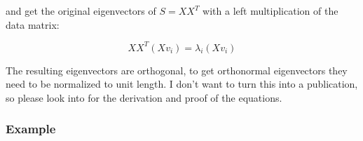 and get the original eigenvectors of $S = X X^{T}$ with a left multiplication of the data matrix:

\begin{equation}
	X X^{T} (X v_{i}) = \lambda_{i} (X v_{i})
\end{equation}

The resulting eigenvectors are orthogonal, to get orthonormal eigenvectors they need to be normalized to unit length. I don't want to turn this into a publication, so please look into \cite{Duda2001} for the derivation and proof of the equations.

\subsubsection{Example}

\label{ssection:example_eigenfaces}

